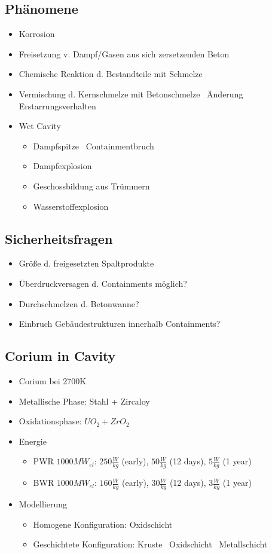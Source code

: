 \documentclass[12pt]{article}
\begin{document}
\subsection{Phänomene}
\begin{itemize}
  \item Korrosion
  \item Freisetzung v. Dampf/Gasen aus sich zersetzenden Beton
  \item Chemische Reaktion d. Bestandteile mit Schmelze
  \item Vermischung d. Kernschmelze mit Betonschmelze \textrightarrow\ Änderung Erstarrungsverhalten
  \item Wet Cavity
  \begin{itemize}
    \item Dampfspitze \textrightarrow\ Containmentbruch
    \item Dampfexplosion
    \item Geschossbildung aus Trümmern
    \item Wasserstoffexplosion
  \end{itemize}
\end{itemize}

\subsection{Sicherheitsfragen}
\begin{itemize}
  \item Größe d. freigesetzten Spaltprodukte
  \item Überdruckversagen d. Containments möglich?
  \item Durchschmelzen d. Betonwanne?
  \item Einbruch Gebäudestrukturen innerhalb Containments?
\end{itemize}

\subsection{Corium in Cavity}
\begin{itemize}
  \item Corium bei 2700K
  \item Metallische Phase: Stahl + Zircaloy
  \item Oxidationsphase: \(UO_2 + ZrO_2\)
  \item Energie
  \begin{itemize}
    \item PWR \(1000MW_{el}\): \(250\frac{W}{kg}\) (early), \(50\frac{W}{kg}\) (12 days), \(5\frac{W}{kg}\) (1 year)
    \item BWR \(1000MW_{el}\): \(160\frac{W}{kg}\) (early), \(30\frac{W}{kg}\) (12 days), \(3\frac{W}{kg}\) (1 year)
  \end{itemize}
  \item Modellierung
  \begin{itemize}
    \item Homogene Konfiguration: Oxidschicht
    \item Geschichtete Konfiguration: Kruste \textrightarrow\ Oxidschicht \textrightarrow\ Metallschicht
  \end{itemize}
\end{itemize}
\end{document}

